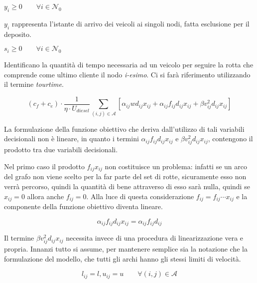 	\begin{minipage}[t]{\varwidth}
		$y_i \geq 0 \qquad \forall i \in \mathcal{N}_0$
	\end{minipage}
	\begin{minipage}[t]{\descwidth}
		$y_i$ rappresenta l’istante di arrivo dei veicoli ai singoli nodi, fatta esclusione per il deposito.
	\end{minipage}

	\begin{minipage}[t]{\varwidth}
		$s_i \geq 0 \qquad \forall i \in \mathcal{N}_0$
	\end{minipage}
	\begin{minipage}[t]{\descwidth}
		Identificano la quantità di tempo necessaria ad un veicolo per seguire la rotta che comprende come ultimo cliente il nodo \emph{i-esimo}. Ci si farà riferimento utilizzando il termine \emph{tourtime}.
	\end{minipage}

	\begin{equation}
		\label{eq:fuel_emission_cost}
		 (c_f + c_e) \cdot 
		 \frac{1}{\eta \cdot U_{diesel}} 
		 \sum_{(i,j) \in \mathcal{A}} \left[
		 	\alpha_{ij}wd_{ij}x_{ij} + 
		 	\alpha_{ij}f_{ij}d_{ij}x_{ij} + 
		 	\beta v_{ij}^2 d_{ij} x_{ij}
		 \right]
	\end{equation}

	La formulazione della funzione obiettivo che deriva dall’utilizzo di tali variabili decisionali non è lineare, in quanto i termini $\alpha_{ij}f_{ij}d_{ij}x_{ij}$ e $\beta v_{ij}^2 d_{ij} x_{ij}$, contengono il prodotto tra due variabili decisionali.

	Nel primo caso il prodotto $f_{ij}x_{ij}$ non costituisce un problema: infatti se un arco del grafo non viene scelto per la far parte del set di rotte, sicuramente esso non verrà percorso, quindi la quantità di bene attraverso di esso sarà nulla, quindi se $x_{ij} = 0$ allora anche $f_{ij} = 0$. Alla luce di questa considerazione $f_{ij} = f_{ij} \cdots x_{ij}$ e la componente della funzione obiettivo diventa lineare.

	$$\alpha_{ij}f_{ij}d_{ij}x_{ij} = \alpha_{ij}f_{ij}d_{ij}$$

	Il termine $\beta v_{ij}^2 d_{ij} x_{ij}$ necessita invece di una procedura di linearizzazione vera e propria. Innanzi tutto si assume, per mantenere semplice sia la notazione che la formulazione del modello, che tutti gli archi hanno gli stessi limiti di velocità.

	$$l_{ij} = l, u_{ij} = u \qquad \forall (i,j) \in \mathcal{A}$$


